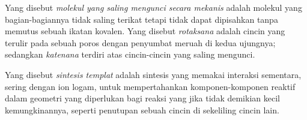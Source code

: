 \begin{definition}\label{def:b3:supramolecular:interlocked}
Yang disebut \emph{molekul yang saling mengunci secara mekanis}
adalah molekul yang bagian-bagiannya tidak saling terikat tetapi tidak dapat dipisahkan
tanpa memutus sebuah ikatan kovalen. Yang disebut \emph{rotaksana} adalah cincin
yang terulir pada sebuah poros dengan penyumbat meruah di kedua ujungnya; sedangkan
\emph{katenana} terdiri atas cincin-cincin yang saling mengunci.
\end{definition}

\begin{definition}\label{def:b3:supramolecular:template}
Yang disebut \emph{sintesis templat} adalah sintesis yang memakai interaksi
sementara, sering dengan ion logam, untuk mempertahankan komponen-komponen reaktif dalam
geometri yang diperlukan bagi reaksi yang jika tidak demikian kecil kemungkinannya, seperti
penutupan sebuah cincin di sekeliling cincin lain.
\end{definition}

